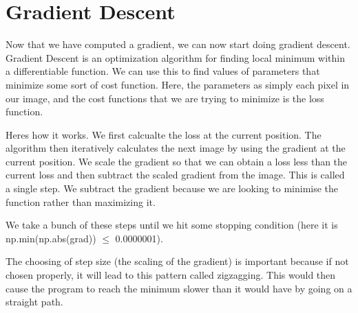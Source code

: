 \documentclass[letterpaper,10pt,english]{jupyterBook}
\begin{document}
\section{Gradient Descent}
\label{\detokenize{finite_gradient:gradient-descent}}
\sphinxAtStartPar
Now that we have computed a gradient, we can now start doing gradient descent. Gradient Descent is an optimization algorithm for finding local minimum within a differentiable function. We can use this to find values of parameters that minimize some sort of cost function. Here, the parameters as simply each pixel in our image, and the cost functions that we are trying to minimize is the loss function.

\sphinxAtStartPar
Heres how it works. We first calcualte the loss at the current position. The algorithm then iteratively calculates the next image by using the gradient at the current position. We scale the gradient so that we can obtain a loss less than the current loss and then subtract the scaled gradient from the image. This is called a single step. We subtract the gradient because we are looking to minimise the function rather than maximizing it.

\sphinxAtStartPar
We take a bunch of these steps until we hit some stopping condition (here it is np.min(np.abs(grad)) \(\leq\) 0.0000001).

\sphinxAtStartPar
The choosing of step size (the scaling of the gradient) is important because if not chosen properly, it will lead to this pattern called zig\sphinxhyphen{}zagging. This would then cause the program to reach the minimum slower than it would have by going on a straight path.
\end{document}

